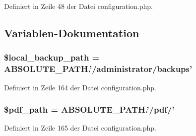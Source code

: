 Definiert in Zeile 48 der Datei configuration.php.

\subsection{Variablen-Dokumentation}
\subsubsection{\setlength{\rightskip}{0pt plus 5cm}\$local\_\-backup\_\-path = ABSOLUTE\_\-PATH.'/administrator/backups'}\label{configuration_8php_f14c7527fa384cf9ee6c0040661a7b5b}




Definiert in Zeile 164 der Datei configuration.php.
\subsubsection{\setlength{\rightskip}{0pt plus 5cm}\$pdf\_\-path = ABSOLUTE\_\-PATH.'/pdf/'}\label{configuration_8php_c812f3395df1d9da3aecc5646ece11c7}




Definiert in Zeile 165 der Datei configuration.php.